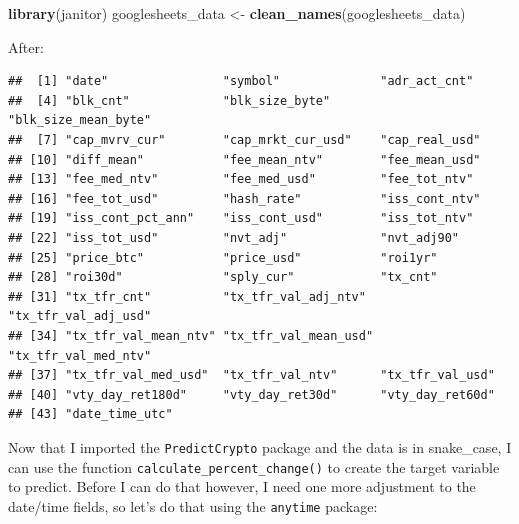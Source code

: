 \documentclass[
]{book}
\newenvironment{Shaded}{\begin{snugshade}}{\end{snugshade}}
\newcommand{\KeywordTok}[1]{\textcolor[rgb]{0.13,0.29,0.53}{\textbf{#1}}}
\newcommand{\NormalTok}[1]{#1}
\newcommand{\OperatorTok}[1]{\textcolor[rgb]{0.81,0.36,0.00}{\textbf{#1}}}
\newcommand{\StringTok}[1]{\textcolor[rgb]{0.31,0.60,0.02}{#1}}
\begin{document}
\begin{Shaded}
\begin{Highlighting}[]
\KeywordTok{library}\NormalTok{(janitor)}
\NormalTok{googlesheets_data <-}\StringTok{ }\KeywordTok{clean_names}\NormalTok{(googlesheets_data)}
\end{Highlighting}
\end{Shaded}

After:

\begin{verbatim}
##  [1] "date"                "symbol"              "adr_act_cnt"        
##  [4] "blk_cnt"             "blk_size_byte"       "blk_size_mean_byte" 
##  [7] "cap_mvrv_cur"        "cap_mrkt_cur_usd"    "cap_real_usd"       
## [10] "diff_mean"           "fee_mean_ntv"        "fee_mean_usd"       
## [13] "fee_med_ntv"         "fee_med_usd"         "fee_tot_ntv"        
## [16] "fee_tot_usd"         "hash_rate"           "iss_cont_ntv"       
## [19] "iss_cont_pct_ann"    "iss_cont_usd"        "iss_tot_ntv"        
## [22] "iss_tot_usd"         "nvt_adj"             "nvt_adj90"          
## [25] "price_btc"           "price_usd"           "roi1yr"             
## [28] "roi30d"              "sply_cur"            "tx_cnt"             
## [31] "tx_tfr_cnt"          "tx_tfr_val_adj_ntv"  "tx_tfr_val_adj_usd" 
## [34] "tx_tfr_val_mean_ntv" "tx_tfr_val_mean_usd" "tx_tfr_val_med_ntv" 
## [37] "tx_tfr_val_med_usd"  "tx_tfr_val_ntv"      "tx_tfr_val_usd"     
## [40] "vty_day_ret180d"     "vty_day_ret30d"      "vty_day_ret60d"     
## [43] "date_time_utc"
\end{verbatim}

Now that I imported the \texttt{PredictCrypto} package and the data is in snake\_case, I can use the function \texttt{calculate\_percent\_change()} to create the target variable to predict. Before I can do that however, I need one more adjustment to the date/time fields, so let's do that using the \texttt{anytime}\citep{R-anytime} package:

\begin{Shaded}
\end{Shaded}
\end{document}

